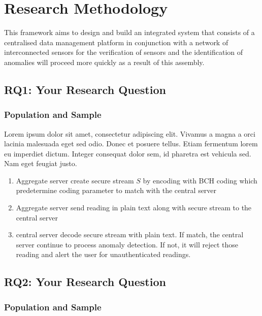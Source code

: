 \chapter{Research Methodology}

This framework aims  to design and build an integrated system that consists of a centralised data management platform in conjunction with a network of interconnected sensors for the verification of sensors and the identification of anomalies will proceed more quickly as a result of this assembly.

\section{RQ1: Your Research Question}

\subsection{Population and Sample}
\lipsum[1]

Lorem ipsum dolor sit amet, consectetur adipiscing elit. Vivamus a magna a orci lacinia malesuada eget sed odio. Donec et posuere tellus. Etiam fermentum lorem eu imperdiet dictum. Integer consequat dolor sem, id pharetra est vehicula sed. Nam eget feugiat justo.
\begin{enumerate}
	\item Aggregate server create secure stream $S$ by encoding with BCH coding which predetermine coding parameter to match with the central server
	\item Aggregate server send reading in plain text along with secure stream to the central server
	\item central server decode secure stream with plain text. If match, the central server continue to process anomaly detection. If not, it will reject those reading and alert the user for unauthenticated readings.
\end{enumerate}

\section{RQ2: Your Research Question}

\subsection{Population and Sample}
\lipsum[1]

